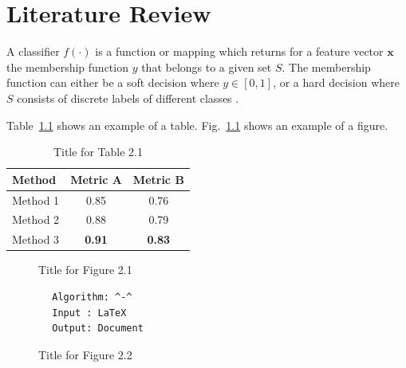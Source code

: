 \chapter{Literature Review}
\label{chap:litreview}

A classifier $f(\cdot)$ is a function or mapping which returns for a
feature vector $\mathbf{x}$ the membership function $y$ that belongs
to a given set $S$. The membership function can either be a soft
decision where $y \in [0,1]$, or a hard decision where $S$ consists
of discrete labels of different classes \cite{maronna2006}.

Table~\ref{tab:example} shows an example of a table.
Fig.~\ref{fig:example} shows an example of a figure.

\begin{table}[ht]
  \centering
  \begin{singlespace}
  \begin{tabular}{lcc}
    \toprule
    \textbf{Method} & \textbf{Metric A} & \textbf{Metric B} \\
    \midrule
    Method 1        & 0.85             & 0.76 \\
    Method 2        & 0.88             & 0.79 \\
    Method 3        & \textbf{0.91}    & \textbf{0.83} \\
    \bottomrule
  \end{tabular}
  \end{singlespace}
  \caption{Title for Table 2.1}
  \label{tab:example}
\end{table}

\begin{figure}[ht]
  \centering
  \fbox{\rule{0pt}{4cm}\rule{0.7\textwidth}{0pt}}
  \caption{Title for Figure 2.1}
  \label{fig:example}
\end{figure}

\begin{table}[htbp]
    \centering
    \begin{lstlisting}
        Algorithm: ^-^
        Input : LaTeX
        Output: Document
    \end{lstlisting}
    \caption{Title for Table 2.2}
    \label{tab:listing}
\end{table}

\begin{figure}[htbp]
    \centering
    
    \caption{Title for Figure 2.2}
    \label{fig:svg}
\end{figure}

